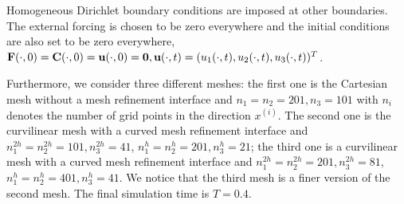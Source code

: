 Homogeneous Dirichlet boundary conditions are imposed at other boundaries. The external forcing is chosen to be zero everywhere and the initial conditions are also set to be zero everywhere, ${\bf F}(\cdot,0) = {\bf C}(\cdot,0) = {\bf u}(\cdot,0) = {\bf 0}, {\bf u}(\cdot,t) = (u_1(\cdot,t), u_2(\cdot,t), u_3(\cdot,t))^T$.

Furthermore, we consider three different meshes: the first one is the Cartesian mesh without a mesh refinement interface and $n_1 = n_2 = 201, n_3 = 101$ with $n_i$ denotes the number of grid points in the direction $x^{(i)}$. The second one is the curvilinear mesh with a curved mesh refinement interface and $n_1^{2h} = n_2^{2h} = 101, n_3^{2h} = 41$, $n_1^h = n_2^h = 201, n_3^h = 21$; the third one is a curvilinear mesh with a curved mesh refinement interface and $n_1^{2h} = n_2^{2h} = 201, n_3^{2h} = 81$, $n_1^h = n_2^h = 401, n_3^h = 41$. We notice that the third mesh is a finer version of the second mesh. The final simulation time is $T = 0.4$.

